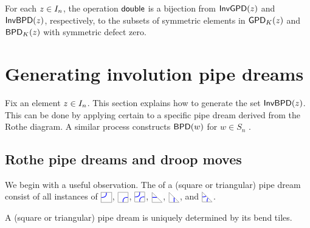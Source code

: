 \documentclass[10pt]{article}
\begin{document}
\begin{corollary}\label{sym-bij-cor}
For each $z \in I_n $,  the operation $\mathsf{double}$ is
a bijection 
from 
 $\mathsf{InvGPD}(z) $ and $\mathsf{InvBPD}(z) $, respectively,
to the subsets of symmetric elements in 
$\mathsf{GPD}_K(z)$ and $\mathsf{BPD}_K(z)$ with symmetric defect zero.
\end{corollary}

\section{Generating involution pipe dreams}\label{gen-sect}

Fix an element $z \in I_n $.
This section explains how to generate the set
$\mathsf{InvBPD}(z)$. This can be done by 
 applying certain  to a specific pipe dream derived from the Rothe diagram.
A similar process constructs  $\mathsf{BPD}(w)$ for $w \in S_n$ \cite[\S5.2]{LLS}.

\subsection{Rothe pipe dreams and droop moves}

We begin with a useful observation.
The  of a (square or triangular) pipe dream
consist of all instances of $\JTILE$, $\CTILE$, $\ETILE$, $\JDIAG$, $\CDIAG$, and $\EDIAG$.

	
\begin{lemma}
A (square or triangular) pipe dream  is uniquely determined
by its bend tiles.
\end{lemma}
\end{document}
